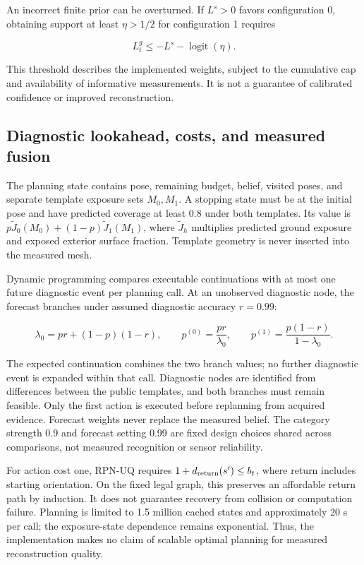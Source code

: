\documentclass[11pt,a4paper]{article}
\begin{document}
An incorrect finite prior can be overturned. If \(L^s>0\) favors configuration 0, obtaining support at least \(\eta>1/2\) for configuration 1 requires

\[
L_t^g\le-L^s-\operatorname{logit}(\eta).
\]

This threshold describes the implemented weights, subject to the cumulative cap and availability of informative measurements. It is not a guarantee of calibrated confidence or improved reconstruction.

\hypertarget{diagnostic-lookahead-costs-and-measured-fusion}{%
\subsection{Diagnostic lookahead, costs, and measured fusion}\label{diagnostic-lookahead-costs-and-measured-fusion}}

The planning state contains pose, remaining budget, belief, visited poses, and separate template exposure sets \(M_0,M_1\). A stopping state must be at the initial pose and have predicted coverage at least 0.8 under both templates. Its value is \(p\widetilde J_0(M_0)+(1-p)\widetilde J_1(M_1)\), where \(\widetilde J_h\) multiplies predicted ground exposure and exposed exterior surface fraction. Template geometry is never inserted into the measured mesh.

Dynamic programming compares executable continuations with at most one future diagnostic event per planning call. At an unobserved diagnostic node, the forecast branches under assumed diagnostic accuracy \(r=0.99\):

\[
\lambda_0=pr+(1-p)(1-r),\qquad
p^{(0)}=\frac{pr}{\lambda_0},\qquad
p^{(1)}=\frac{p(1-r)}{1-\lambda_0}.
\]

The expected continuation combines the two branch values; no further diagnostic event is expanded within that call. Diagnostic nodes are identified from differences between the public templates, and both branches must remain feasible. Only the first action is executed before replanning from acquired evidence. Forecast weights never replace the measured belief. The category strength 0.9 and forecast setting 0.99 are fixed design choices shared across comparisons, not measured recognition or sensor reliability.

For action cost one, RPN-UQ requires \(1+d_{\rm return}(s')\le b_t\), where return includes starting orientation. On the fixed legal graph, this preserves an affordable return path by induction. It does not guarantee recovery from collision or computation failure. Planning is limited to 1.5 million cached states and approximately 20 s per call; the exposure-state dependence remains exponential. Thus, the implementation makes no claim of scalable optimal planning for measured reconstruction quality.
\end{document}
